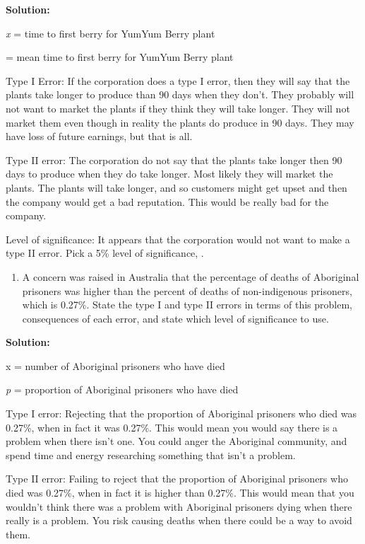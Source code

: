\documentclass[]{book}
\providecommand{\tightlist}{%
  \setlength{\itemsep}{0pt}\setlength{\parskip}{0pt}}
\begin{document}
\textbf{Solution:}

\emph{x} = time to first berry for YumYum Berry plant

= mean time to first berry for YumYum Berry plant

Type I Error: If the corporation does a type I error, then they will say that the plants take longer to produce than 90 days when they don't. They probably will not want to market the plants if they think they will take longer. They will not market them even though in reality the plants do produce in 90 days. They may have loss of future earnings, but that is all.

Type II error: The corporation do not say that the plants take longer then 90 days to produce when they do take longer. Most likely they will market the plants. The plants will take longer, and so customers might get upset and then the company would get a bad reputation. This would be really bad for the company.

Level of significance: It appears that the corporation would not want to make a type II error. Pick a 5\% level of significance, .

\begin{enumerate}
\def\labelenumi{\alph{enumi}.}
\setcounter{enumi}{1}
\tightlist
\item
  A concern was raised in Australia that the percentage of deaths of Aboriginal prisoners was higher than the percent of deaths of non-indigenous prisoners, which is 0.27\%. State the type I and type II errors in terms of this problem, consequences of each error, and state which level of significance to use.
\end{enumerate}

\textbf{Solution:}

x = number of Aboriginal prisoners who have died

\emph{p} = proportion of Aboriginal prisoners who have died

Type I error: Rejecting that the proportion of Aboriginal prisoners who died was 0.27\%, when in fact it was 0.27\%. This would mean you would say there is a problem when there isn't one. You could anger the Aboriginal community, and spend time and energy researching something that isn't a problem.

Type II error: Failing to reject that the proportion of Aboriginal prisoners who died was 0.27\%, when in fact it is higher than 0.27\%. This would mean that you wouldn't think there was a problem with Aboriginal prisoners dying when there really is a problem. You risk causing deaths when there could be a way to avoid them.
\end{document}

